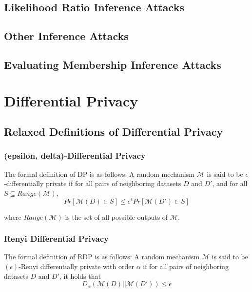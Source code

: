 \subsection{Likelihood Ratio Inference Attacks}
\label{sec:lira}


\subsection{Other Inference Attacks}
\label{sec:othermia}

\subsection{Evaluating Membership Inference Attacks}
\label{sec:evalmia}



\section{Differential Privacy}
\label{sec:dp}

\subsection{Relaxed Definitions of Differential Privacy}
\label{sec:relaxeddp}




\subsubsection{(epsilon, delta)-Differential Privacy}
\label{sec:eddp}

The formal definition of DP is as follows:
A random mechanism $\mathcal{M}$ is said to be $\epsilon$-differentially private if for all pairs of neighboring datasets $D$ and $D'$, and for all $S \subseteq Range(\mathcal{M})$,
\begin{equation}
    Pr[\mathcal{M}(D) \in S] \leq e^{\epsilon} Pr[\mathcal{M}(D') \in S]
\end{equation}
    
    where $Range(\mathcal{M})$ is the set of all possible outputs of $\mathcal{M}$.


\subsubsection{Renyi Differential Privacy}
\label{sec:rdp}

The formal definition of RDP is as follows:
A random mechanism $\mathcal{M}$ is said to be $(\epsilon)$-Renyi differentially private with order $\alpha$ if for all pairs of neighboring datasets $D$ and $D'$, it holds that
\begin{equation}
    D_{\alpha}(\mathcal{M}(D) || \mathcal{M}(D')) \leq \epsilon
\end{equation}
    
